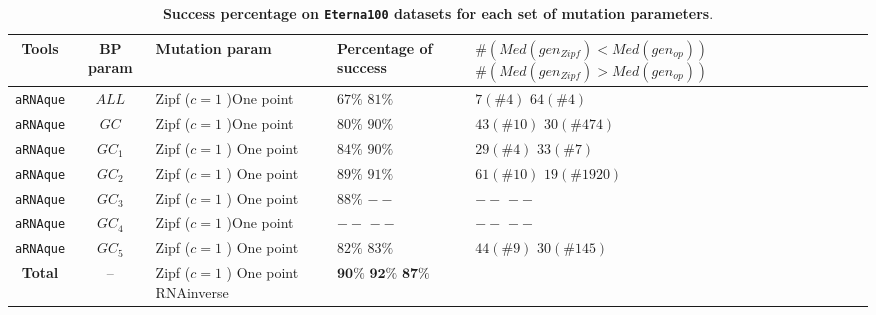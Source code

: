 \begin{table}[H]
	\caption{\textbf{Success percentage on \texttt{Eterna100} datasets for each set of mutation parameters}.}
	\centering
	\vspace*{0.5cm}
	\hspace*{-3cm}
	\begin{tabular}[H]{|c|c|p{30mm}|p{25mm}|p{60mm}|}
		\hline 
		\textbf{Tools} &\textbf{BP param}&\textbf{Mutation param}& \textbf{Percentage of success}&\textbf{$\#(Med(gen_{Zipf}) < Med(gen_{op})) $} \newline \textbf{ $\#(Med(gen_{Zipf}) > Med(gen_{op}) )$}\\
		\hline 
		\texttt{aRNAque} & $ALL$& Zipf ($c=1$ )\newline One point & $67\%$ \newline $81\%$ & $7(\# 4)$ \newline $64(\# 4)$\\
		\hline
		\texttt{aRNAque} & $GC$& Zipf ($c=1$ )\newline One point  & $80\%$ \newline $90\%$ &$43(\# 10)$ \newline $30(\# 474)$ \\
		\hline
		\texttt{aRNAque} & $GC_1$& Zipf ($c=1$ ) \newline One point  & $84\%$ \newline $90\%$ &$29(\# 4)$ \newline $33(\# 7)$ \\
		\hline
		\texttt{aRNAque} &  $GC_2$&Zipf ($c=1$ ) \newline One point &  $89\%$ \newline $91\%$ & $61(\# 10)$ \newline $19(\# 1920)$ \\
		\hline
		\texttt{aRNAque} &  $GC_3$ & Zipf ($c=1$ )  \newline One point  &  $88\%$ \newline $--$& $--$ \newline $--$\\
		\hline
		\texttt{aRNAque} & $GC_4$& Zipf ($c=1$ )\newline One point &  $--$ \newline $--$ & $--$ \newline $--$\\
		\hline
		\texttt{aRNAque} &  $GC_5$& Zipf ($c=1$ )  \newline One point &  $82\%$ \newline $83\%$ &$44(\# 9)$ \newline $30(\# 145)$ \\
		\hline
		\textbf{Total}  & -- & Zipf ($c=1$ ) \newline One point  \newline RNAinverse &$\textbf{90\%}$ \newline $\textbf{92\%}$ \newline $\textbf{87\%}$ &\\
		\hline
	\end{tabular}
	\label{tab:summary}
\end{table}

